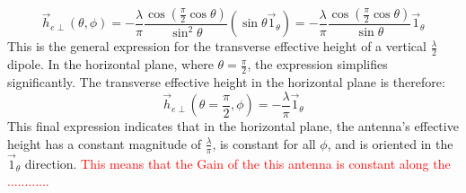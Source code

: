 \begin{equation}
	\vec{h}_{e\perp}(\theta, \phi) = -\frac{\lambda}{\pi} \frac{\cos(\frac{\pi}{2}\cos\theta)}{\sin^2\theta} (\sin\theta \vec{1}_\theta) = -\frac{\lambda}{\pi} \frac{\cos(\frac{\pi}{2}\cos\theta)}{\sin\theta} \vec{1}_\theta
	\label{eq:he_perp_general}
\end{equation}
\vspace{0.5em}
This is the general expression for the transverse effective height of a vertical $\frac{\lambda}{2}$ dipole. In the horizontal plane, where $\theta = \frac{\pi}{2}$, the expression simplifies significantly. The transverse effective height in the horizontal plane is therefore:
\begin{equation}
	\boxed{\vec{h}_{e\perp}\left(\theta=\frac{\pi}{2}, \phi\right) = -\frac{\lambda}{\pi} \vec{1}_\theta}
	\label{eq:he_perp_horizontal}
\end{equation}
\vspace{0.5em}
This final expression indicates that in the horizontal plane, the antenna's effective height has a constant magnitude of $\frac{\lambda}{\pi}$, is constant for all $\phi$, and is oriented in the $\vec{1}_\theta$ direction.
\textcolor{red}{This means that the Gain of the this antenna is constant along the ............}

